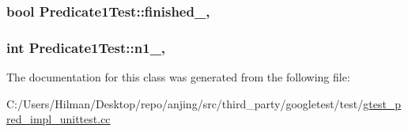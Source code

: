 \subsubsection[{finished\+\_\+}]{\setlength{\rightskip}{0pt plus 5cm}bool Predicate1\+Test\+::finished\+\_\+\hspace{0.3cm}{\ttfamily [static]}, {\ttfamily [protected]}}\label{class_predicate1_test_a6d45fb2d1f01a5c8baf28f60039c244e}
\hypertarget{class_predicate1_test_a528d9f7f618b17802962a3824eea11e3}{}
\subsubsection[{n1\+\_\+}]{\setlength{\rightskip}{0pt plus 5cm}int Predicate1\+Test\+::n1\+\_\+\hspace{0.3cm}{\ttfamily [static]}, {\ttfamily [protected]}}\label{class_predicate1_test_a528d9f7f618b17802962a3824eea11e3}


The documentation for this class was generated from the following file\+:\begin{DoxyCompactItemize}
\item 
C\+:/\+Users/\+Hilman/\+Desktop/repo/anjing/src/third\+\_\+party/googletest/test/\hyperlink{gtest__pred__impl__unittest_8cc}{gtest\+\_\+pred\+\_\+impl\+\_\+unittest.\+cc}\end{DoxyCompactItemize}
